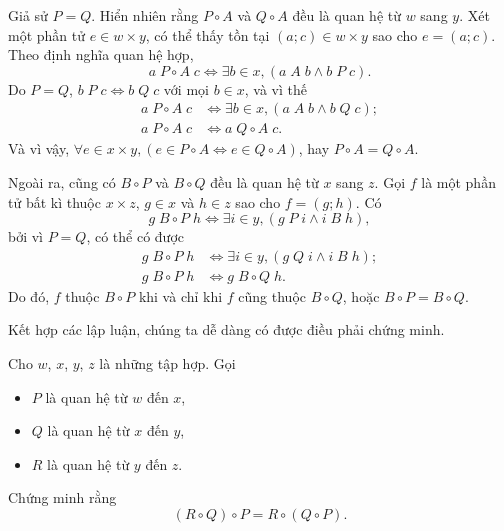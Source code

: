 Giả sử $P = Q$. Hiển nhiên rằng $P \circ A$ và $Q \circ A$ đều là quan hệ từ $w$ sang $y$. Xét một phần tử $e \in w \times y$, có thể thấy tồn tại $(a; c) \in w \times y$ sao cho $e = (a; c)$. Theo định nghĩa quan hệ hợp, 
\begin{equation*}
   a\;P \circ A\;c \iff \exists b \in x, \left(a\;A\;b \land b\;P\;c\right).
\end{equation*}
Do $P = Q$, $b\;P\;c \iff b\;Q\;c$ với mọi $b \in x$, và vì thế 
\begin{align*}
   a\;P \circ A\;c &\iff \exists b \in x, \left(a\;A\;b \land b\;Q\;c\right); \\
   a\;P \circ A\;c &\iff a\;Q \circ A\;c.
\end{align*}
Và vì vậy, $\forall e \in x \times y, (e \in P \circ A \iff e \in Q \circ A)$, hay $P \circ A = Q \circ A$.

Ngoài ra, cũng có $B \circ P$ và $B \circ Q$ đều là quan hệ từ $x$ sang $z$. Gọi $f$ là một phần tử bất kì thuộc $x \times z$, $g \in x$ và $h \in z$ sao cho $f = (g; h)$. Có 
\begin{equation*}
   g\;B \circ P\;h \iff \exists i \in y, \left(g\;P\;i \land i\;B\;h\right),
\end{equation*}
bởi vì $P = Q$, có thể có được \begin{align*}
   g\;B \circ P\;h &\iff \exists i \in y, \left(g\;Q\;i \land i\;B\;h\right); \\
   g\;B \circ P\;h &\iff g\;B\circ Q\;h.
\end{align*}
Do đó, $f$ thuộc $B \circ P$ khi và chỉ khi $f$ cũng thuộc $B\circ Q$, hoặc $B \circ P  = B \circ Q$.

Kết hợp các lập luận, chúng ta dễ dàng có được điều phải chứng minh.

\exercise Cho $w$, $x$, $y$, $z$ là những tập hợp. Gọi
\begin{itemize}
   \item $P$ là quan hệ từ $w$ đến $x$,
   \item $Q$ là quan hệ từ $x$ đến $y$,
   \item $R$ là quan hệ từ $y$ đến $z$.
\end{itemize}
Chứng minh rằng \begin{equation*}
   (R\circ Q) \circ P = R \circ (Q \circ P).
\end{equation*}

\solution

